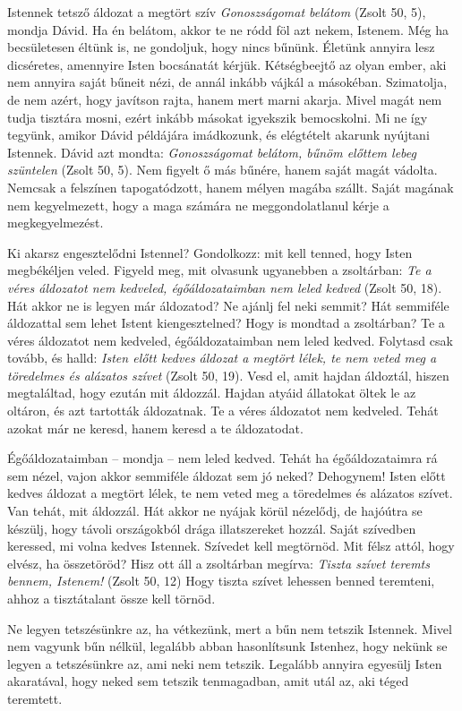 \documentclass[twoside]{article}
\begin{document}
\begin{lectio}{Istennek tetsző áldozat a megtört szív}
\noindent \textit{Gonoszságomat belátom} (Zsolt 50, 5), mondja Dávid. Ha én belátom, akkor te ne
ródd föl azt nekem, Istenem. Még ha becsületesen éltünk is, ne gondoljuk, hogy nincs bűnünk. Életünk
annyira lesz dicséretes, amennyire Isten bocsánatát kérjük. Kétségbeejtő az olyan ember, aki nem
annyira saját bűneit nézi, de annál inkább vájkál a másokéban. Szimatolja, de nem azért, hogy
javítson rajta, hanem mert marni akarja. Mivel magát nem tudja tisztára mosni, ezért inkább másokat
igyekszik bemocskolni. Mi ne így tegyünk, amikor Dávid példájára imádkozunk, és elégtételt akarunk
nyújtani Istennek. Dávid azt mondta: \textit{Gonoszságomat belátom, bűnöm előttem lebeg szüntelen}
(Zsolt 50, 5). Nem figyelt ő más bűnére, hanem saját magát vádolta. Nemcsak a felszínen
tapogatódzott, hanem mélyen magába szállt. Saját magának nem kegyelmezett, hogy a maga számára ne
meggondolatlanul kérje a megkegyelmezést.

Ki akarsz engesztelődni Istennel? Gondolkozz: mit kell tenned, hogy Isten megbékéljen veled. Figyeld
meg, mit olvasunk ugyanebben a zsoltárban: \textit{Te a véres áldozatot nem kedveled,
égőáldozataimban nem leled kedved} (Zsolt 50, 18). Hát akkor ne is legyen már áldozatod? Ne ajánlj
fel neki semmit? Hát semmiféle áldozattal sem lehet Istent kiengesztelned? Hogy is mondtad a
zsoltárban? Te a véres áldozatot nem kedveled, égőáldozataimban nem leled kedved. Folytasd csak
tovább, és halld: \textit{Isten előtt kedves áldozat a megtört lélek, te nem veted meg a töredelmes
és alázatos szívet} (Zsolt 50, 19). Vesd el, amit hajdan áldoztál, hiszen megtaláltad, hogy ezután
mit áldozzál. Hajdan atyáid állatokat öltek le az oltáron, és azt tartották áldozatnak. Te a véres
áldozatot nem kedveled. Tehát azokat már ne keresd, hanem keresd a te áldozatodat.

Égőáldozataimban – mondja – nem leled kedved. Tehát ha égőáldozataimra rá sem nézel, vajon akkor
semmiféle áldozat sem jó neked? Dehogynem! Isten előtt kedves áldozat a megtört lélek, te nem veted
meg a töredelmes és alázatos szívet. Van tehát, mit áldozzál. Hát akkor ne nyájak körül nézelődj, de
hajóútra se készülj, hogy távoli országokból drága illatszereket hozzál. Saját szívedben keressed,
mi volna kedves Istennek. Szívedet kell megtörnöd. Mit félsz attól, hogy elvész, ha összetöröd? Hisz
ott áll a zsoltárban megírva: \textit{Tiszta szívet teremts bennem, Istenem!} (Zsolt 50, 12) Hogy
tiszta szívet lehessen benned teremteni, ahhoz a tisztátalant össze kell törnöd.

Ne legyen tetszésünkre az, ha vétkezünk, mert a bűn nem tetszik Istennek. Mivel nem vagyunk bűn
nélkül, legalább abban hasonlítsunk Istenhez, hogy nekünk se legyen a tetszésünkre az, ami neki nem
tetszik. Legalább annyira egyesülj Isten akaratával, hogy neked sem tetszik tenmagadban, amit utál
az, aki téged teremtett.
\end{lectio}
\end{document}
